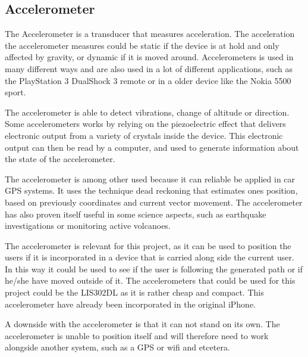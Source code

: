 \subsection{Accelerometer}\label{subs_acel}

The Accelerometer is a transducer that measures acceleration. The acceleration the accelerometer measures could be static if the device is at hold and only affected by gravity, or dynamic if it is moved around\cite{acc_engi}. Accelerometers is used in many different ways and are also used in a lot of different applications, such as the PlayStation 3 DualShock 3 remote\cite{acc_ps3} or in a older device like the Nokia 5500 sport\cite{acc_nokia}.


The accelerometer is able to detect vibrations, change of altitude or direction\cite{acc_engi}. Some accelerometers works by relying on the piezoelectric effect that delivers electronic output from a variety of crystals inside the device\cite{acc_piezo}. This electronic output can then be read by a computer, and used to generate information about the state of the accelerometer.


The accelerometer is among other used because it can reliable be applied in car GPS systems. It uses the technique dead reckoning that estimates ones position, based on previously coordinates and current vector movement\cite{acc_dead}. The accelerometer has also proven itself useful in some science aspects, such as earthquake investigations or monitoring active volcanoes\cite{acc_vulkan}. 


The accelerometer is relevant for this project, as it can be used to position the users if it is incorporated in a device that is carried along side the current user. In this way it could be used to see if the user is following the generated path or if he/she have moved outside of it. The accelerometers that could be used for this project could be the LIS302DL as it is rather cheap and compact\cite{acc_price,acc_lis302dl}. This accelerometer have already been incorporated in the original iPhone\cite{acc_iPhone}.


A downside with the accelerometer is that it can not stand on its own. The accelerometer is unable to position itself and will therefore need to work alongside another system, such as a GPS or wifi and etcetera. 
